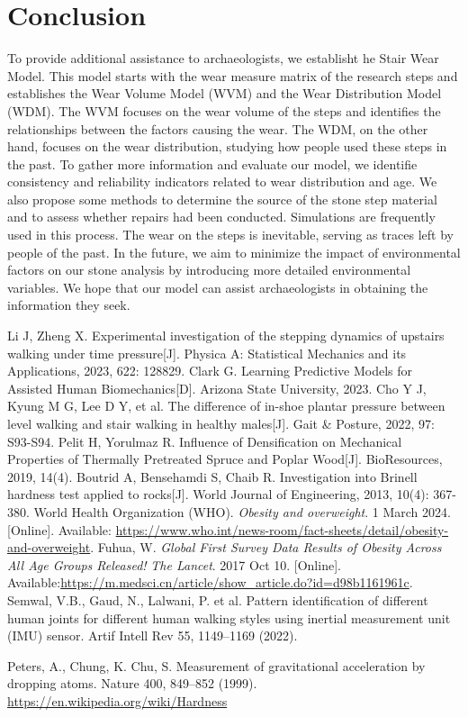 \documentclass[12pt]{article}  %
\numberwithin{equation}{section} %
\begin{document}
\section{Conclusion}
To provide additional assistance to archaeologists, we establisht he Stair Wear Model. This model starts with the wear measure matrix of the research steps and establishes the Wear Volume Model (WVM) and the Wear Distribution Model (WDM). The WVM focuses on the wear volume of the steps and identifies the relationships between the factors causing the wear. The WDM, on the other hand, focuses on the wear distribution, studying how people used these steps in the past. To gather more information and evaluate our model, we identifie consistency and reliability indicators related to wear distribution and age. We also propose some methods to determine the source of the stone step material and  to assess whether repairs had been conducted. Simulations are frequently used in this process. The wear on the steps is inevitable, serving as traces left by people of the past. In the future, we aim to minimize the impact of environmental factors on our stone analysis by introducing more detailed environmental variables. We hope that our model can assist archaeologists in obtaining the information they seek.

\begin{thebibliography}{99}
	 Li J, Zheng X. Experimental investigation of the stepping dynamics of upstairs walking under time pressure[J]. Physica A: Statistical Mechanics and its Applications, 2023, 622: 128829.
	 Clark G. Learning Predictive Models for Assisted Human Biomechanics[D]. Arizona State University, 2023.
	 Cho Y J, Kyung M G, Lee D Y, et al. The difference of in-shoe plantar pressure between level walking and stair walking in healthy males[J]. Gait & Posture, 2022, 97: S93-S94.
	 Pelit H, Yorulmaz R. Influence of Densification on Mechanical Properties of Thermally Pretreated Spruce and Poplar Wood[J]. BioResources, 2019, 14(4).
	Boutrid A, Bensehamdi S, Chaib R. Investigation into Brinell hardness test applied to rocks[J]. World Journal of Engineering, 2013, 10(4): 367-380.
    World Health Organization (WHO). \textit{Obesity and overweight}. 1 March 2024. [Online]. Available: \url{https://www.who.int/news-room/fact-sheets/detail/obesity-and-overweight}.
	Fuhua, W. \textit{Global First Survey Data Results of Obesity Across All Age Groups Released!} \textit{The Lancet}. 2017 Oct 10. [Online]. Available:\url{https://m.medsci.cn/article/show_article.do?id=d98b1161961c}.
     Semwal, V.B., Gaud, N., Lalwani, P. et al. Pattern identification of different human joints for different human walking styles using inertial measurement unit (IMU) sensor. Artif Intell Rev 55, 1149–1169 (2022). 
     
    Peters, A., Chung, K.  Chu, S. Measurement of gravitational acceleration by dropping atoms. Nature 400, 849–852 (1999). 
    \url{https://en.wikipedia.org/wiki/Hardness}
\end{thebibliography}
\end{document}
